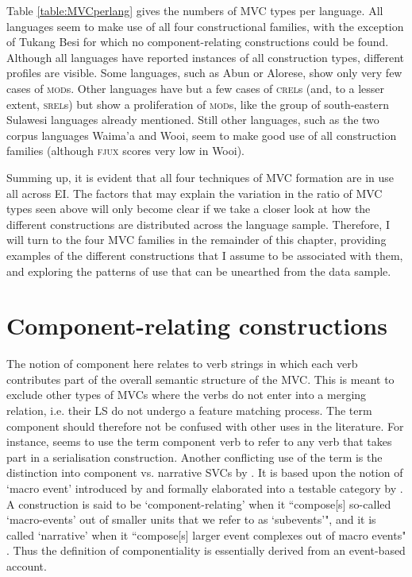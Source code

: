 Table \ref{table:MVCperlang} gives the numbers of MVC types per language. All languages seem to make use of all four constructional families, with the exception of Tukang Besi for which no component-relating constructions could be found. Although all languages have reported instances of all construction types, different profiles are visible. Some languages, such as Abun or Alorese, show only very few cases of \textsc{mod}s. Other languages have but a few cases of \textsc{crel}s (and, to a lesser extent, \textsc{srel}s) but show a proliferation of \textsc{mod}s, like the group of south-eastern Sulawesi languages already mentioned. Still other languages, such as the two corpus languages Waima'a and Wooi, seem to make good use of all construction families (although \textsc{fjux} scores very low in Wooi). 

Summing up, it is evident that all four techniques of MVC formation are in use all across EI. The factors that may explain the variation in the ratio of MVC types seen above will only become clear if we take a closer look at how the different constructions are distributed across the language sample. Therefore, I will turn to the four MVC families in the remainder of this chapter, providing examples of the different constructions that I assume to be associated with them, and exploring the patterns of use that can be unearthed from the data sample.

\section{Component-relating constructions}\label{sec:crel}

The notion of component here relates to verb strings in which each verb contributes part of the overall semantic structure of the MVC. This is meant to exclude other types of MVCs where the verbs do not enter into a merging relation, i.e. their LS do not undergo a feature matching process. The term component should therefore not be confused with other uses in the literature. For instance, \citet{dixon2006serial} seems to use the term component verb to refer to any verb that takes part in a serialisation construction. Another conflicting use of the term is the distinction into component vs. narrative SVCs by \citet{vanstaden2008serial}. It is based upon the notion of `macro event' introduced by \citet{talmy2000toward} and formally elaborated into a testable category by \citet{bohnemeyer2007principles, bohnemeyer2011}. A construction is said to be `component-relating' when it ``compose[s] so-called `macro-events’
out of smaller units that we refer to as `subevents’", and it is called `narrative' when it ``compose[s] larger event complexes out of macro events" \citep[28]{vanstaden2008serial}. Thus the definition of componentiality is essentially derived from an event-based account. 

